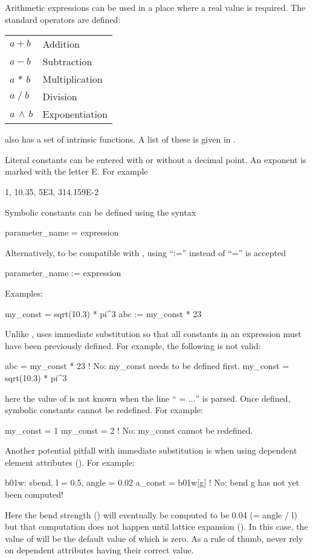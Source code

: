 {{Arithmetic expressions can be used in a place where a real value is required.
The standard operators are defined: \hfil\break
\hspace*{0.15in}
\begin{tabular}{ll}
  $a + b$           & Addition        \\
  $a - b$           & Subtraction     \\
  $a \, \ast \, b$  & Multiplication  \\
  $a \; / \; b$     & Division        \\
  $a \, \land \, b$ & Exponentiation  \\
\end{tabular}
\hfil\break
\bmad also has a set of intrinsic functions. A list of these is given
in .

Literal constants can be entered with or without a decimal point. An
exponent is marked with the letter E. For example
\begin{example}
  1, 10.35, 5E3, 314.159E-2
\end{example}
Symbolic constants can be defined using the syntax
\begin{example}
  parameter_name = expression
\end{example}
Alternatively, to be compatible with \mad, using ``:='' instead of ``='' is accepted
\begin{example}
  parameter_name := expression
\end{example}
Examples:
\begin{example}
  my_const = sqrt(10.3) * pi^3
  abc     := my_const * 23
\end{example}
Unlike \mad, \bmad uses immediate substitution so that all constants
in an expression must have been previously defined. For example, the
following is not valid:
\begin{example}
  abc      = my_const * 23      ! No: my_const needs to be defined first.
  my_const = sqrt(10.3) * pi^3
\end{example}
here the value of  is not known when the line ``
= $\ldots$'' is parsed. Once
defined, symbolic constants cannot be redefined. For example:
\begin{example}
  my_const = 1
  my_const = 2  ! No: my_const cannot be redefined.
\end{example}

Another potential pitfall with immediate substitution is when using
dependent element attributes (). For example:
\begin{example}
  b01w: sbend, l = 0.5, angle = 0.02
  a_const = b01w[g]    ! No: bend g has not yet been computed!
\end{example}
Here the bend strength  () will eventually be
computed to be 0.04 (= angle / l) but that computation does not happen
until lattice expansion (). In this case, the value of
 will be the default value of  which is zero.  As a
rule of thumb, never rely on dependent attributes having their correct
value.

}}
